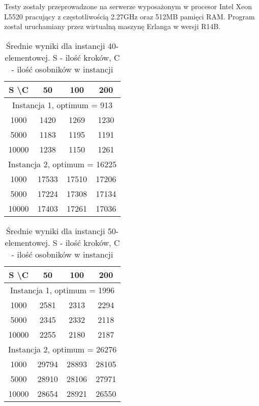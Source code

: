   Testy zostały przeprowadzone na serwerze wyposażonym w procesor Intel Xeon
  L5520 pracujący z częstotliwością 2.27GHz oraz 512MB pamięci RAM. Program
  został uruchamiany przez wirtualną maszynę Erlanga w wersji R14B.

  \begin{table}[h!]
  \begin{center}
  \caption{Średnie wyniki dla instancji 40-elementowej.
           {\small S - ilość kroków, C - ilość osobników w instancji}}
  \begin{tabular}{c|ccc}
    \hline
      S \textbackslash C & 50 & 100 & 200 \\
    \hline
      \multicolumn{4}{c}{Instancja 1, optimum = 913} \\
    \hline
      1000  & 1420 & 1269 & 1230 \\ %
      5000  & 1183 & 1195 & 1191 \\ %
      10000 & 1238 & 1150 & 1261 \\ %
    \hline
      \multicolumn{4}{c}{Instancja 2, optimum = 16225} \\
    \hline
      1000  & 17533 & 17510 & 17206 \\ %
      5000  & 17224 & 17308 & 17134 \\ %
      10000 & 17403 & 17261 & 17036    %
  \end{tabular}
  \end{center}
  \end{table}

  \begin{table}[h!]
  \begin{center}
  \caption{Średnie wyniki dla instancji 50-elementowej.
           {\small S - ilość kroków, C - ilość osobników w instancji}}
  \begin{tabular}{c|ccc}
    \hline
      S \textbackslash C & 50 & 100 & 200 \\
    \hline
      \multicolumn{4}{c}{Instancja 1, optimum = 1996} \\
    \hline
      1000  & 2581 & 2313 & 2294 \\ %
      5000  & 2345 & 2332 & 2118 \\ %
      10000 & 2255 & 2180 & 2187 \\ %
    \hline
      \multicolumn{4}{c}{Instancja 2, optimum = 26276} \\
    \hline
      1000  & 29794 & 28893 & 28105 \\ %
      5000  & 28910 & 28106 & 27971 \\ %
      10000 & 28654 & 28921 & 26550    %
  \end{tabular}
  \end{center}
  \end{table}

